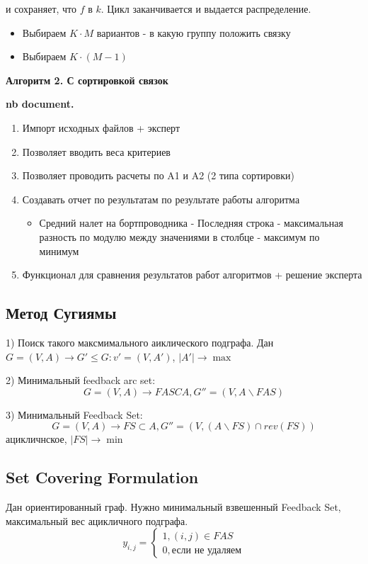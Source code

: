 \documentclass[%
10pt, %
final, %
oneside, %
onecolumn, %
centertags]{article} %
\theoremstyle{plain}
\theoremstyle{definition}
\theoremstyle{remark}
\begin{document}
и сохраняет, что $f$ в $k$. Цикл заканчивается и выдается распределение.

\begin{itemize}
	\item Выбираем $K \cdot M$ вариантов - в какую группу положить связку
	\item Выбираем $K \cdot (M-1)$
\end{itemize}

\textbf{Алгоритм 2. С сортировкой связок}

\textbf{nb document.}

\begin{enumerate}
	\item Импорт исходных файлов + эксперт
	\item Позволяет вводить веса критериев
	\item Позволяет проводить расчеты по A1 и A2 (2 типа сортировки)
	\item Создавать отчет по результатам по результате работы алгоритма
	\begin{itemize}
		
		\item Средний налет на бортпроводника - Последняя строка - максимальная разность по модулю между значениями в столбце - максимум по минимум
	\end{itemize}
	\item Функционал для сравнения результатов работ алгоритмов + решение эксперта
\end{enumerate}

\subsection{Метод Сугиямы}

1) Поиск такого максмимального аиклического подграфа. Дан $G = (V, A) \to G' \leq G: v' = (V, A')$, $|A'| \to \max$

2) Минимальный feedback arc set:
$$G = (V, A) \to FASCA, G'' = (V, A \backslash FAS)$$

3) Минимальный Feedback Set:
$$G = (V, A) \to FS \subset A, G'' = (V, (A \backslash FS) \cap rev(FS))$$
ацикличнское, $|FS| \to \min$

\subsection{Set Covering Formulation}

Дан ориентированный граф. Нужно минимальный взвешенный Feedback Set, максимальный вес ацикличного подграфа.
$$y_{i,j} = \begin{cases}
	1, (i,j) \in FAS \\
	0, \text{если не удаляем}
\end{cases}$$
\end{document}
